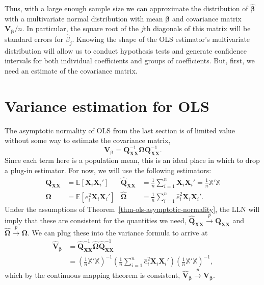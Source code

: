 \documentclass[
  13pt,
  letterpaper,
  DIV=11,
  numbers=noendperiod]{scrreprt}
\newcommand{\mb}{\symbf}
\newcommand{\E}{\mathbb{E}}
\newcommand{\X}{\mb{X}}
\newcommand{\Xmat}{\mathbb{X}}
\newcommand{\bfbeta}{\mb{\beta}}
\newcommand{\bhat}{\widehat{\mb{\beta}}}
\newcommand{\inprob}{\overset{p}{\to}}
\theoremstyle{plain}
\theoremstyle{definition}
\theoremstyle{definition}
\theoremstyle{remark}
\begin{document}
Thus, with a large enough sample size we can approximate the
distribution of \(\bhat\) with a multivariate normal distribution with
mean \(\bfbeta\) and covariance matrix \(\mb{V}_{\bfbeta}/n\). In
particular, the square root of the \(j\)th diagonals of this matrix will
be standard errors for \(\widehat{\beta}_j\). Knowing the shape of the
OLS estimator's multivariate distribution will allow us to conduct
hypothesis tests and generate confidence intervals for both individual
coefficients and groups of coefficients. But, first, we need an estimate
of the covariance matrix.

\section{Variance estimation for OLS}\label{variance-estimation-for-ols}

The asymptotic normality of OLS from the last section is of limited
value without some way to estimate the covariance matrix, \[ 
\mb{V}_{\bfbeta} = \mb{Q}_{\X\X}^{-1}\mb{\Omega}\mb{Q}_{\X\X}^{-1}.
\] Since each term here is a population mean, this is an ideal place in
which to drop a plug-in estimator. For now, we will use the following
estimators: \[ 
\begin{aligned}
  \mb{Q}_{\X\X} &= \E[\X_{i}\X_{i}'] & \widehat{\mb{Q}}_{\X\X} &= \frac{1}{n} \sum_{i=1}^{n} \X_{i}\X_{i}' = \frac{1}{n}\Xmat'\Xmat \\
  \mb{\Omega} &= \E[e_i^2\X_i\X_i'] & \widehat{\mb{\Omega}} & = \frac{1}{n}\sum_{i=1}^n\widehat{e}_i^2\X_i\X_i'.
\end{aligned}
\] Under the assumptions of Theorem~\ref{thm-ols-asymptotic-normality},
the LLN will imply that these are consistent for the quantities we need,
\(\widehat{\mb{Q}}_{\X\X} \inprob \mb{Q}_{\X\X}\) and
\(\widehat{\mb{\Omega}} \inprob \mb{\Omega}\). We can plug these into
the variance formula to arrive at \[ 
\begin{aligned}
  \widehat{\mb{V}}_{\bfbeta} &= \widehat{\mb{Q}}_{\X\X}^{-1}\widehat{\mb{\Omega}}\widehat{\mb{Q}}_{\X\X}^{-1} \\
  &= \left( \frac{1}{n} \Xmat'\Xmat \right)^{-1} \left( \frac{1}{n} \sum_{i=1}^n\widehat{e}_i^2\X_i\X_i' \right) \left( \frac{1}{n} \Xmat'\Xmat \right)^{-1},
\end{aligned}
\] which by the continuous mapping theorem is consistent,
\(\widehat{\mb{V}}_{\bfbeta} \inprob \mb{V}_{\bfbeta}\).
\end{document}
